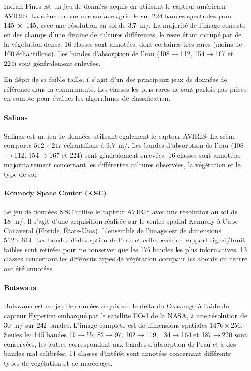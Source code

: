 Indian Pines est un jeu de données acquis en utilisant le capteur américain \gls{AVIRIS}. La scène couvre une surface agricole sur 224 bandes spectrales pour \SI{145x145}{\px}, avec une résolution au sol de \SI{3,7}{\meter/\px}. La majorité de l'image consiste en des champs d'une dizaine de cultures différentes, le reste étant occupé par de la végétation dense. 16 classes sont annotées, dont certaines très rares (moins de 100 échantillons). Les bandes d'absorption de l'eau (108$\rightarrow$112, 154$\rightarrow$167 et 224) sont généralement enlevées.

En dépit de sa faible taille, il s'agit d'un des principaux jeux de données de référence dans la communauté. Les classes les plus rares ne sont parfois pas prises en compte pour évaluer les algorithmes de classification.

\paragraph{Salinas}
Salinas est un jeu de données utilisant également le capteur \gls{AVIRIS}. La scène comporte $512\times217$ échantillons à \SI{3,7}{\meter/\px}. Les bandes d'absorption de l'eau (108$\rightarrow$112, 154$\rightarrow$167 et 224) sont généralement enlevées. 16 classes sont annotées, majoritairement concernant les différentes cultures observées, la végétation et le type de sol.

\paragraph{Kennedy Space Center (KSC)}
Le jeu de données KSC utilise le capteur \gls{AVIRIS} avec une résolution au sol de \SI{18}{\meter/\px}. Il s'agit d'une acquisition réalisée sur le centre spatial Kennedy à Cape Canaveral (Floride, États-Unis). L'ensemble de l'image est de dimensions $512\times614$. Les bandes d'absorption de l'eau et celles avec un rapport signal/bruit faibles sont retirées pour ne conserver que les 176 bandes les plus informatives. 13 classes concernant les différents types de végétation occupant les abords du centre ont été annotées.

\paragraph{Botswana}
Botswana est un jeu de données acquis sur le delta du Okavango à l'aide du capteur Hyperion embarqué par le satellite EO-1 de la NASA, à une résolution de \SI{30}{\meter/\px} sur 242 bandes. L'image complète est de dimensions spatiales $1476\times256$. Seules les 145 bandes 10$\rightarrow$55, 82$\rightarrow$97, 102$\rightarrow$119, 134$\rightarrow$164 et 187$\rightarrow$220 sont conservées, les autres correspondant aux bandes d'absorption de l'eau et à des bandes mal calibrées. 14 classes d'intérêt sont annotées concernant différents types de végétation et de marécages.

